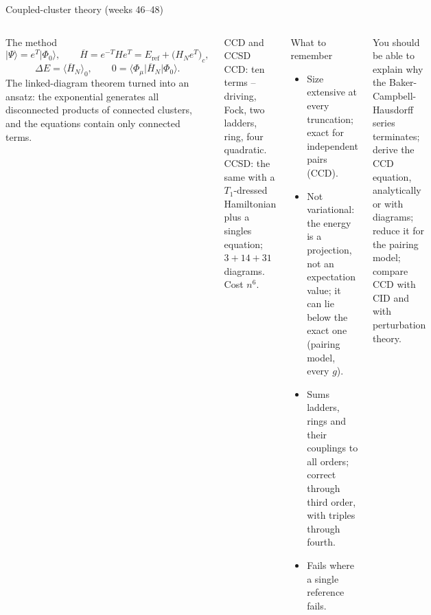 \documentclass[aspectratio=169,10pt]{beamer}
\newcommand{\ket}[1]{\vert #1\rangle}
\newcommand{\mel}[3]{\langle #1\lvert #2\rvert #3\rangle}
\newcommand{\av}[1]{\langle #1\rangle_0}
\newcommand{\Eref}{E_{\mathrm{ref}}}
\newcommand{\ph}{\Phi_0}
\newcommand{\Hbar}{\overline{H}}
\begin{document}
\begin{frame}[shrink=7]{Coupled-cluster theory (weeks 46--48)}
\small
\begin{columns}[T]
\begin{block}{The method}
\[
 \ket{\Psi}=e^{T}\ket{\ph},\qquad \Hbar=e^{-T}He^{T}=\Eref+\bigl(H_Ne^{T}\bigr)_c,
\]
\[
 \Delta E=\av{\Hbar_N},\qquad 0=\mel{\Phi_\mu}{\Hbar_N}{\ph}.
\]
The linked-diagram theorem turned into an ansatz: the exponential generates all disconnected products of connected clusters, and the equations contain only connected terms.
\end{block}
\begin{block}{CCD and CCSD}
CCD: ten terms -- driving, Fock, two ladders, ring, four quadratic. CCSD: the same with a $T_1$-dressed Hamiltonian plus a singles equation; $3+14+31$ diagrams. Cost $n^6$.
\end{block}
\begin{block}{What to remember}
\begin{itemize}
\item Size extensive at every truncation; exact for independent pairs (CCD).
\item Not variational: the energy is a projection, not an expectation value; it can lie below the exact one (pairing model, every $g$).
\item Sums ladders, rings and their couplings to all orders; correct through third order, with triples through fourth.
\item Fails where a single reference fails.
\end{itemize}
\end{block}
\begin{block}{You should be able to}
explain why the Baker-Campbell-Hausdorff series terminates; derive the CCD equation, analytically or with diagrams; reduce it for the pairing model; compare CCD with CID and with perturbation theory.
\end{block}
\end{columns}
\end{frame}
\end{document}
